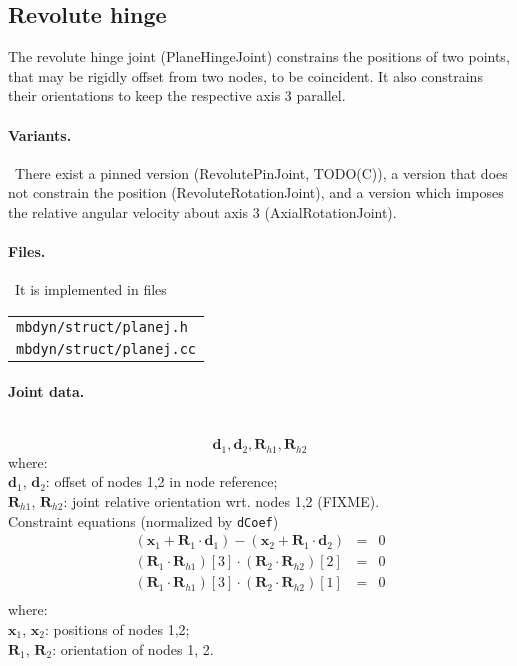 \documentclass[10pt,dvips,fleqn]{report}
\newcommand{\T}[1]{\boldsymbol{#1}}
\begin{document}
\subsection{Revolute hinge}
The revolute hinge joint (PlaneHingeJoint) constrains the positions 
of two points, that may be rigidly offset from two nodes, 
to be coincident.
It also constrains their orientations to keep the respective axis 3 
parallel.

\paragraph{Variants.} \
There exist a pinned version (RevolutePinJoint, TODO(C)),
a version that does not constrain the position (RevoluteRotationJoint),
and a version which imposes the relative angular velocity about axis 3
(AxialRotationJoint).

\paragraph{Files.} \
It is implemented in files

\begin{tabular}{l}
\texttt{mbdyn/struct/planej.h} \\
\texttt{mbdyn/struct/planej.cc}
\end{tabular}

\paragraph{Joint data.} \
\begin{equation}
\T d_1, \T d_2, \T R_{h1}, \T R_{h2}
\end{equation}
where:\\
$\T d_1$, $\T d_2$: offset of nodes 1,2 in node reference;\\
$\T R_{h1}$, $\T R_{h2}$: joint relative orientation wrt. nodes 1,2 (FIXME).\\

\noindent
Constraint equations (normalized by \texttt{dCoef})
\begin{eqnarray*}
	(\T x_1+\T R_1\cdot \T d_1) - (\T x_2+\T R_1\cdot \T d_2)& = & 0 \\
	(\T R_1\cdot \T R_{h1})[3]\cdot (\T R_2\cdot \T R_{h2})[2] & = & 0 \\
	(\T R_1\cdot \T R_{h1})[3]\cdot (\T R_2\cdot \T R_{h2})[1] & = & 0 \\
\end{eqnarray*}
where:\\
$\T x_1$, $\T x_2$: positions of nodes 1,2;\\
$\T R_{1}$, $\T R_{2}$: orientation of nodes 1, 2.\\
\end{document}
